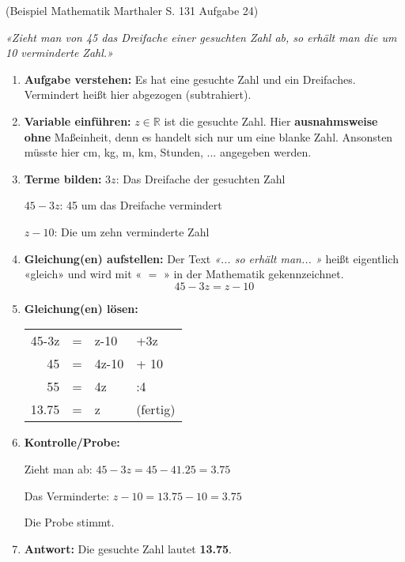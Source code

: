



\usepackage{amssymb} 
\renewcommand{\metaHeaderLine}{Theorieblatt}
\renewcommand{\arbeitsblattTitel}{Systematisches Lösen von Textaufgaben}

\arbeitsblattHeader{}
(Beispiel Mathematik Marthaler S. 131 Aufgabe 24)

\textit{«Zieht man von 45 das Dreifache einer gesuchten Zahl ab, so
erhält man die um 10 verminderte Zahl.»}


\begin{enumerate}
\item \textbf{Aufgabe verstehen:} Es hat eine gesuchte Zahl und ein
Dreifaches. Vermindert heißt hier abgezogen (subtrahiert).

\item \textbf{Variable einführen:} $z\in \mathbb{R}$ ist die gesuchte
Zahl.
Hier \textbf{ausnahmsweise ohne} Maßeinheit, denn es handelt sich nur
um eine blanke Zahl. Ansonsten müsste hier cm, kg, m, km, Stunden,
... angegeben werden.

\item \textbf{Terme bilden:}
$3z$: Das Dreifache der gesuchten Zahl

$45-3z$: 45 um das Dreifache vermindert

$z-10$: Die um zehn verminderte Zahl

\item \textbf{Gleichung(en) aufstellen:} Der Text \textit{«... so
erhält man... »} heißt eigentlich «gleich» und wird mit « $=$ » in der
Mathematik gekennzeichnet.
$$45 - 3z = z - 10$$

\item \textbf{Gleichung(en) lösen:}

\begin{tabular}{rcl|l}

 45-3z &=& z-10 & +3z\\

 45 &=& 4z-10 & + 10 \\

 55 &=& 4z  & :4\\

  13.75 &=& z & (fertig)
 \end{tabular} 

\item \textbf{Kontrolle/Probe:}

Zieht man ab: $45-3z = 45-41.25 = 3.75$

Das Verminderte: $z-10 = 13.75 - 10 = 3.75$

Die Probe stimmt.

\item \textbf{Antwort:} Die gesuchte Zahl lautet \textbf{13.75}.

\end{enumerate}


